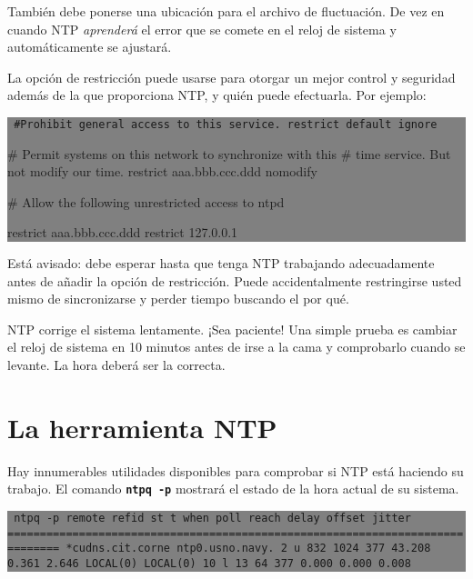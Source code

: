 \documentclass[12pt]{article}
\begin{document}
También debe ponerse una ubicación para el archivo de fluctuación. De 
vez en cuando NTP \textit{aprenderá} el error que se comete en el reloj de
sistema y automáticamente se ajustará.



La opción de restricción puede usarse para otorgar un mejor control y 
seguridad además de la que proporciona NTP, y quién puede efectuarla.
Por ejemplo:

\colorbox{grey}{\parbox[t]{0.95\linewidth}{ \vspace*{0.5cm} {\tt 
\#Prohibit general access to this service.
restrict default ignore

\# Permit systems on this network to synchronize with this
\# time service. But not modify our time.
restrict aaa.bbb.ccc.ddd nomodify

\# Allow the following unrestricted access to ntpd

restrict aaa.bbb.ccc.ddd
restrict 127.0.0.1
 } \vspace*{0.5cm} } } 


Está avisado: debe esperar hasta que tenga NTP trabajando adecuadamente 
antes de añadir la opción de restricción. Puede accidentalmente 
restringirse usted mismo de sincronizarse y perder tiempo buscando el por qué.



NTP corrige el sistema lentamente. ¡Sea paciente! Una simple prueba es
cambiar el reloj de sistema en 10 minutos antes de irse a la cama y
comprobarlo cuando se levante. La hora deberá ser la correcta.

\section{ La herramienta NTP}


Hay innumerables utilidades disponibles para comprobar si NTP está 
haciendo su trabajo. El comando \texttt{\textbf{ntpq -p}} mostrará el estado de la hora
actual de su sistema.


\colorbox{grey}{\parbox[t]{0.95\linewidth}{ \vspace*{0.5cm} {\tt      
ntpq -p
remote           refid      st t when poll reach   delay   offset  jitter
==============================================================================
*cudns.cit.corne ntp0.usno.navy.  2 u  832 1024  377   43.208    0.361   2.646
 LOCAL(0)        LOCAL(0)        10 l   13   64  377    0.000    0.000   0.008
 } \vspace*{0.5cm} } } 
\end{document}
